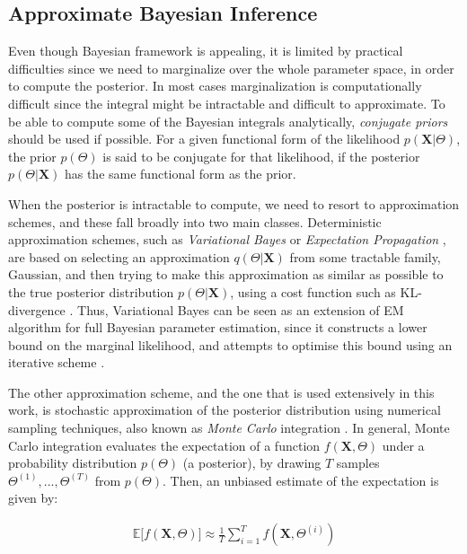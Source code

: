 \subsection{Approximate Bayesian Inference} \label{approx-bayes-infer-subsect}
Even though Bayesian framework is appealing, it is limited by practical difficulties since we need to marginalize over the whole parameter space, in order to compute the posterior. In most cases marginalization is computationally difficult since the integral might be intractable and difficult to approximate. To be able to compute some of the Bayesian integrals analytically, \emph{conjugate priors} should be used if possible. For a given functional form of the likelihood $p(\mathbf{X}|\Theta)$, the prior $p(\Theta)$ is said to be conjugate for that likelihood, if the posterior $p(\Theta|\mathbf{X})$ has the same functional form as the prior.

When the posterior is intractable to compute, we need to resort to approximation schemes, and these fall broadly into two main classes. Deterministic approximation schemes, such as \emph{Variational Bayes} \citep{Beal2003} or \emph{Expectation Propagation} \citep{Minka1999}, are based on selecting an approximation $q(\Theta|\mathbf{X})$ from some tractable family, \eg Gaussian, and then trying to make this approximation as similar as possible to the true posterior distribution $p(\Theta|\mathbf{X})$, using a cost function such as KL-divergence \cite[Ch. 21]{Murphy2012}. Thus, Variational Bayes can be seen as an extension of EM algorithm for full Bayesian parameter estimation, since it constructs a lower bound on the marginal likelihood, and attempts to optimise this bound using an iterative scheme \citep{Beal2003}.

The other approximation scheme, and the one that is used extensively in this work, is stochastic approximation of the posterior distribution using numerical sampling techniques, also known as \emph{Monte Carlo} integration \citep{Robert1999, Liu2001}. In general, Monte Carlo integration evaluates the expectation of a function $f(\mathbf{X},\Theta)$ under a probability distribution $p(\Theta)$ (\eg a posterior), by drawing $T$ samples $\Theta^{(1)},...,\Theta^{(T)}$ from $p(\Theta)$. Then, an unbiased estimate of the expectation is given by:

\begin{equation} \label{mc-f-bayes}
  \begin{aligned}
	\mathbb{E}\big[ f(\mathbf{X}, \Theta)\big] \approx \frac{1}{T} \sum\limits_{i=1}^{T} f(\mathbf{X}, \Theta^{(i)})
  \end{aligned}
\end{equation}

